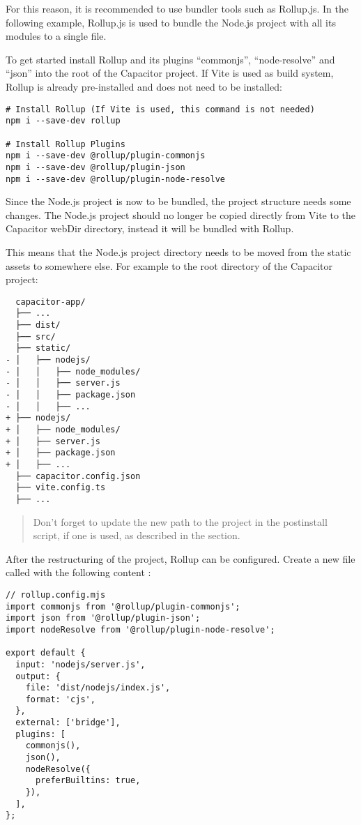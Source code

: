 For this reason, it is recommended to use bundler tools such as Rollup.js.
In the following example, Rollup.js is used to bundle the Node.js project with all its modules to a single file.
\cite{rollup, rollup-plugins}

To get started install Rollup and its plugins \enquote{commonjs}, \enquote{node-resolve} and \enquote{json} into the root of the Capacitor project.
If Vite is used as build system, Rollup is already pre-installed and does not need to be installed:

\begin{verbatim}
# Install Rollup (If Vite is used, this command is not needed)
npm i --save-dev rollup

# Install Rollup Plugins
npm i --save-dev @rollup/plugin-commonjs
npm i --save-dev @rollup/plugin-json
npm i --save-dev @rollup/plugin-node-resolve
\end{verbatim}

Since the Node.js project is now to be bundled, the project structure needs some changes.
The Node.js project should no longer be copied directly from Vite to the Capacitor webDir directory, instead it will be bundled with Rollup.

This means that the Node.js project directory needs to be moved from the static assets to somewhere else.
For example to the root directory of the Capacitor project:

\begin{verbatim}
  capacitor-app/
  ├── ...
  ├── dist/
  ├── src/
  ├── static/
- │   ├── nodejs/
- │   │   ├── node_modules/
- │   │   ├── server.js
- │   │   ├── package.json
- │   │   ├── ...
+ ├── nodejs/
+ │   ├── node_modules/
+ │   ├── server.js
+ │   ├── package.json
+ │   ├── ...
  ├── capacitor.config.json
  ├── vite.config.ts
  ├── ... 
\end{verbatim}

\begin{quote}
  Don't forget to update the new path to the project in the postinstall script,
  if one is used, as described in the  section.
\end{quote}

\newpage

After the restructuring of the project, Rollup can be configured.
Create a new file called  with the following content \cite{rollup, rollup-plugins}:

\begin{verbatim}
// rollup.config.mjs
import commonjs from '@rollup/plugin-commonjs';
import json from '@rollup/plugin-json';
import nodeResolve from '@rollup/plugin-node-resolve';

export default {
  input: 'nodejs/server.js',
  output: {
    file: 'dist/nodejs/index.js',
    format: 'cjs',
  },
  external: ['bridge'],
  plugins: [
    commonjs(),
    json(),
    nodeResolve({
      preferBuiltins: true,
    }),
  ],
}; 
\end{verbatim}

